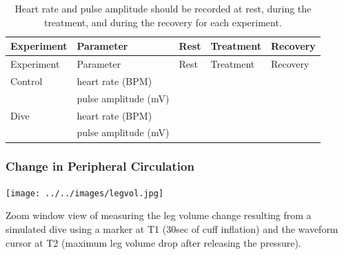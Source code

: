 \documentclass[
  letterpaper,
  DIV=11,
  numbers=noendperiod,
  oneside]{scrartcl}
\begin{document}
\hypertarget{tbl-hrdata}{}
\begin{longtable}[]{@{}lllll@{}}
\caption{\label{tbl-hrdata}Heart rate and pulse amplitude should be
recorded at rest, during the treatment, and during the recovery for each
experiment.}\tabularnewline
\toprule\noalign{}
Experiment & Parameter & Rest & Treatment & Recovery \\
\midrule\noalign{}
\endfirsthead
\toprule\noalign{}
Experiment & Parameter & Rest & Treatment & Recovery \\
\midrule\noalign{}
\endhead
\bottomrule\noalign{}
\endlastfoot
Control & heart rate (BPM) & & & \\
& pulse amplitude (mV) & & & \\
Dive & heart rate (BPM) & & & \\
& pulse amplitude (mV) & & & \\
\end{longtable}

\hypertarget{change-in-peripheral-circulation}{%
\subsubsection{Change in Peripheral
Circulation}\label{change-in-peripheral-circulation}}

\begin{marginfigure}

{\centering \texttt{[image: ../../images/legvol.jpg]}

}

\caption{\label{fig-legvol}Zoom window view of measuring the leg volume
change resulting from a simulated dive using a marker at T1 (30sec of
cuff inflation) and the waveform cursor at T2 (maximum leg volume drop
after releasing the pressure).}

\end{marginfigure}
\end{document}
